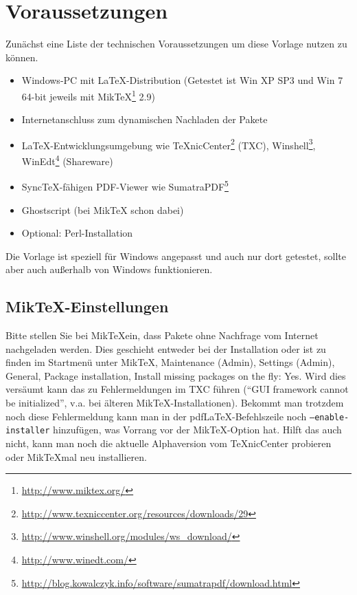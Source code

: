 \section{Voraussetzungen}%
\label{sec:Voraussetzungen}

Zunächst eine Liste der technischen Voraussetzungen um diese Vorlage nutzen zu können.

\begin{itemize}
	\item Windows-PC mit \LaTeX-Distribution (Getestet ist Win XP SP3 und Win 7 64-bit jeweils mit MikTeX\footnote{\url{http://www.miktex.org/}} 2.9)
	\item Internetanschluss zum dynamischen Nachladen der Pakete
	\item \LaTeX-Entwicklungsumgebung wie \zb TeXnicCenter\footnote{\url{http://www.texniccenter.org/resources/downloads/29}} (TXC), Winshell\footnote{\url{http://www.winshell.org/modules/ws_download/}}, WinEdt\footnote{\url{http://www.winedt.com/}} (Shareware)
	\item Sync\TeX-fähigen PDF-Viewer wie \zb SumatraPDF\footnote{\url{http://blog.kowalczyk.info/software/sumatrapdf/download.html}}
	\item Ghostscript (bei MikTeX schon dabei)
	\item Optional: Perl-Installation
\end{itemize}

Die Vorlage ist speziell für Windows angepasst und auch nur dort getestet, sollte aber auch außerhalb von Windows funktionieren.

\subsection{Mik\TeX-Einstellungen}
Bitte stellen Sie bei Mik\TeX ein, dass Pakete ohne Nachfrage vom Internet nachgeladen werden. Dies geschieht entweder bei der Installation oder ist zu finden im Startmenü unter MikTeX, Maintenance (Admin), Settings (Admin), General, Package installation, Install missing packages on the fly: Yes. Wird dies versäumt kann das zu Fehlermeldungen im TXC führen (\enquote{GUI framework cannot be initialized}, v.a. bei älteren MikTeX-Installationen). Bekommt man trotzdem noch diese Fehlermeldung kann man in der pdf\LaTeX-Befehlszeile noch \texttt{--enable-installer} hinzufügen, was Vorrang vor der Mik\TeX-Option hat. Hilft das auch nicht, kann man noch die aktuelle Alphaversion vom TeXnicCenter probieren oder Mik\TeX mal neu installieren.

